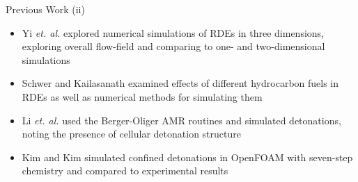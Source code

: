 \begin{frame}{Previous Work (ii)}
\begin{itemize}
\item Yi \textit{et. al.} \cite{yi} explored numerical simulations of RDEs in three dimensions, exploring overall flow-field and comparing to one- and two-dimensional simulations 
\item Schwer and Kailasanath \cite{schwer1} examined effects of different hydrocarbon fuels in RDEs as well as numerical methods for simulating them 
\item Li \textit{et. al.} \cite{li} used the Berger-Oliger AMR routines \cite{berger1984} and simulated detonations, noting the presence of cellular detonation structure 
\item Kim and Kim \cite{kim} simulated confined detonations in OpenFOAM with seven-step chemistry and compared to experimental results 
\end{itemize}
\end{frame}

